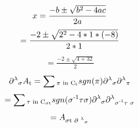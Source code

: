 \documentclass[a4paper, 12pt]{report}
\begin{document}
 
\begin{equation*}
\begin{split}   
x=\frac{-b \pm \sqrt{b\textsuperscript{2}-4ac}}{2a} 
\end{split}   
\end{equation*} 
\begin{equation*}
\begin{split}   
=\frac{-2 \pm \sqrt{2\textsuperscript{2}-4*1*(-8)}}{2*1} 
\end{split}    
\end{equation*} 
\begin{equation*} 
\begin{split}  
=\frac{-2 \pm \sqrt{4+32}}{2}
\end{split}   
\end{equation*} 
\begin{equation*}
\begin{split}   
\partial \textsuperscript{$\lambda$}\textsubscript{$\sigma$}A\textsubscript{t}=\sum \textsubscript{$\pi$ in C\textsubscript{t}} sgn(\pi) \partial \textsuperscript{$\lambda$}\textsubscript{$\sigma$}  \partial \textsuperscript{$\lambda$}\textsubscript{$\pi$}
\end{split}   
\end{equation*} 
\begin{equation*}
\begin{split}   
=\sum \textsubscript{$\tau$ in C\textsubscript{$\sigma$t}} sgn(\sigma\textsuperscript{-1}\tau\sigma) \partial \textsuperscript{$\lambda$}\textsubscript{$\sigma$}\partial \textsuperscript{$\lambda$}\textsubscript{$\sigma$\textsuperscript{-1}$\tau$ $\sigma$} 
\end{split}   
\end{equation*} 
\begin{equation*} 
\begin{split}  
=A\textsubscript{$\sigma$t $\partial$ \textsuperscript{$\lambda$}\textsubscript{$\sigma$}}
\end{split}  
\end{equation*} 
\end{document}
